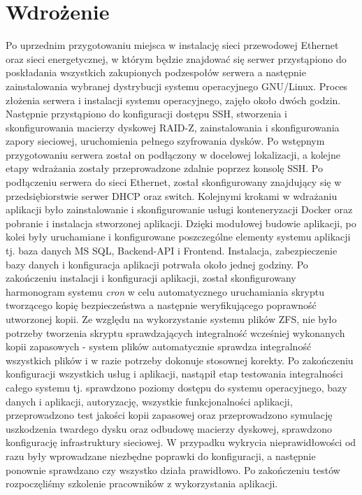 \documentclass[12pt,a4paper]{article}
\begin{document}
	\section{Wdrożenie}
		\indent Po uprzednim przygotowaniu miejsca w instalację sieci przewodowej Ethernet oraz sieci energetycznej, w którym będzie znajdować się serwer  przystąpiono
		do poskładania wszystkich zakupionych podzespołów serwera a następnie zainstalowania wybranej dystrybucji systemu operacyjnego GNU/Linux. Proces złożenia serwera i instalacji
		systemu operacyjnego, zajęło około dwóch godzin. Następnie przystąpiono do konfiguracji dostępu SSH, stworzenia i skonfigurowania macierzy dyskowej RAID-Z,
		zainstalowania i skonfigurowania zapory sieciowej, uruchomienia pełnego szyfrowania dysków. Po wstępnym przygotowaniu serwera został on podłączony w docelowej lokalizacji,
		a kolejne etapy	wdrażania zostały przeprowadzone zdalnie poprzez konsolę SSH. Po podłączeniu serwera do sieci Ethernet, został skonfigurowany znajdujący się w przedsiębiorstwie
		serwer DHCP	oraz switch. Kolejnymi krokami w wdrażaniu aplikacji było zainstalowanie i skonfigurowanie usługi konteneryzacji Docker oraz pobranie i instalacja stworzonej aplikacji.
		Dzięki modułowej budowie aplikacji, po kolei były uruchamiane i konfigurowane poszczególne elementy systemu aplikacji tj. baza danych MS SQL, Backend-API i Frontend.
		Instalacja, zabezpieczenie bazy danych i konfiguracja aplikacji potrwała około jednej godziny. Po zakończeniu instalacji i konfiguracji aplikacji, został skonfigurowany 
		harmonogram systemu \emph{cron} w celu automatycznego uruchamiania skryptu tworzącego kopię bezpieczeństwa a następnie weryfikującego poprawność utworzonej kopii.
		Ze względu na wykorzystanie systemu plików ZFS, nie było potrzeby tworzenia skryptu sprawdzających integralność wcześniej wykonanych kopii zapasowych
		- system plików automatycznie sprawdza integralność wszystkich plików i w razie potrzeby dokonuje stosownej korekty. Po zakończeniu konfiguracji wszystkich usług i aplikacji,
		nastąpił etap testowania integralności całego systemu tj. sprawdzono poziomy dostępu do systemu operacyjnego, bazy danych i aplikacji, autoryzację, wszystkie funkcjonalności aplikacji,
		przeprowadzono test jakości kopii zapasowej oraz przeprowadzono symulację uszkodzenia twardego dysku oraz odbudowę macierzy dyskowej,
		sprawdzono konfigurację infrastruktury sieciowej. W przypadku wykrycia nieprawidłowości od razu były wprowadzane niezbędne poprawki do konfiguracji, a następnie ponownie
		sprawdzano czy wszystko działa prawidłowo. Po zakończeniu testów rozpoczęliśmy szkolenie pracowników z wykorzystania aplikacji.
	\newpage
	
\end{document}
